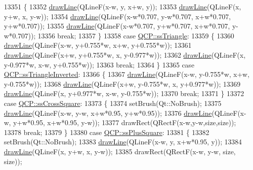 \begin{DoxyCode}
13351     \{
13352       \hyperlink{a00047_a0b4b1b9bd495e182c731774dc800e6e0}{drawLine}(QLineF(x-w, y, x+w, y));
13353       \hyperlink{a00047_a0b4b1b9bd495e182c731774dc800e6e0}{drawLine}(QLineF(x, y+w, x, y-w));
13354       \hyperlink{a00047_a0b4b1b9bd495e182c731774dc800e6e0}{drawLine}(QLineF(x-w*0.707, y-w*0.707, x+w*0.707, y+w*0.707));
13355       \hyperlink{a00047_a0b4b1b9bd495e182c731774dc800e6e0}{drawLine}(QLineF(x-w*0.707, y+w*0.707, x+w*0.707, y-w*0.707));
13356       \textcolor{keywordflow}{break};
13357     \}
13358     \textcolor{keywordflow}{case} \hyperlink{a00143_af66d0711d42fe78d96c28abadc67f26fa71324858fe181ad5d5ff36b6eca4f448}{QCP::ssTriangle}:
13359     \{
13360       \hyperlink{a00047_a0b4b1b9bd495e182c731774dc800e6e0}{drawLine}(QLineF(x-w, y+0.755*w, x+w, y+0.755*w));
13361       \hyperlink{a00047_a0b4b1b9bd495e182c731774dc800e6e0}{drawLine}(QLineF(x+w, y+0.755*w, x, y-0.977*w));
13362       \hyperlink{a00047_a0b4b1b9bd495e182c731774dc800e6e0}{drawLine}(QLineF(x, y-0.977*w, x-w, y+0.755*w));
13363       \textcolor{keywordflow}{break};
13364     \}
13365     \textcolor{keywordflow}{case} \hyperlink{a00143_af66d0711d42fe78d96c28abadc67f26fa17fd9aa8f51529e09ecacdacbe920271}{QCP::ssTriangleInverted}:
13366     \{
13367       \hyperlink{a00047_a0b4b1b9bd495e182c731774dc800e6e0}{drawLine}(QLineF(x-w, y-0.755*w, x+w, y-0.755*w));
13368       \hyperlink{a00047_a0b4b1b9bd495e182c731774dc800e6e0}{drawLine}(QLineF(x+w, y-0.755*w, x, y+0.977*w));
13369       \hyperlink{a00047_a0b4b1b9bd495e182c731774dc800e6e0}{drawLine}(QLineF(x, y+0.977*w, x-w, y-0.755*w));
13370       \textcolor{keywordflow}{break};
13371     \}
13372     \textcolor{keywordflow}{case} \hyperlink{a00143_af66d0711d42fe78d96c28abadc67f26faa830c1cd1028a60eece7b84768face5e}{QCP::ssCrossSquare}:
13373     \{
13374       setBrush(Qt::NoBrush);
13375       \hyperlink{a00047_a0b4b1b9bd495e182c731774dc800e6e0}{drawLine}(QLineF(x-w, y-w, x+w*0.95, y+w*0.95));
13376       \hyperlink{a00047_a0b4b1b9bd495e182c731774dc800e6e0}{drawLine}(QLineF(x-w, y+w*0.95, x+w*0.95, y-w));
13377       drawRect(QRectF(x-w,y-w,size,size));
13378       \textcolor{keywordflow}{break};
13379     \}
13380     \textcolor{keywordflow}{case} \hyperlink{a00143_af66d0711d42fe78d96c28abadc67f26fa2322889660847e07337730222ee373c1}{QCP::ssPlusSquare}:
13381     \{
13382       setBrush(Qt::NoBrush);
13383       \hyperlink{a00047_a0b4b1b9bd495e182c731774dc800e6e0}{drawLine}(QLineF(x-w, y, x+w*0.95, y));
13384       \hyperlink{a00047_a0b4b1b9bd495e182c731774dc800e6e0}{drawLine}(QLineF(x, y+w, x, y-w));
13385       drawRect(QRectF(x-w, y-w, size, size));

\end{DoxyCode}
